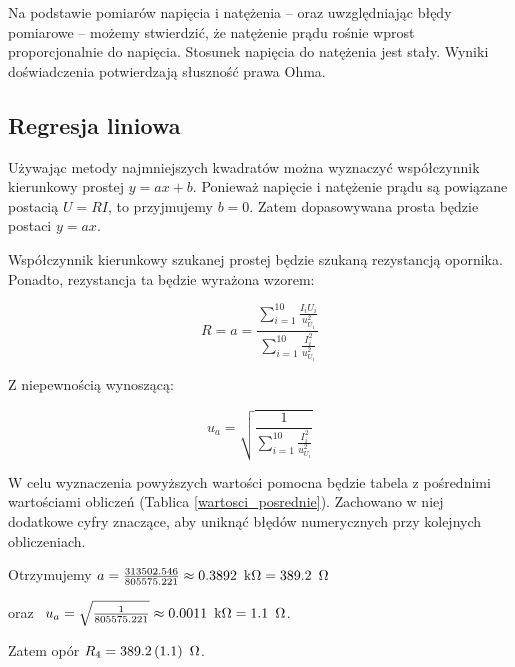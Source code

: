 \documentclass[a4paper]{article}
\newlength{\du}
\begin{document}
Na podstawie pomiarów napięcia i natężenia -- oraz uwzględniając błędy pomiarowe -- możemy stwierdzić, że natężenie prądu rośnie wprost proporcjonalnie do napięcia.
Stosunek napięcia do natężenia jest stały.
Wyniki doświadczenia potwierdzają słuszność prawa Ohma.

\subsection{Regresja liniowa}

Używając metody najmniejszych kwadratów można wyznaczyć współczynnik kierunkowy prostej $y = ax + b$.
Ponieważ napięcie i natężenie prądu są powiązane postacią $U = RI$, to przyjmujemy $b = 0$.
Zatem dopasowywana prosta będzie postaci $y = ax$.

Współczynnik kierunkowy szukanej prostej będzie szukaną rezystancją opornika. Ponadto, rezystancja ta będzie wyrażona wzorem:

$$R = a = \frac{\sum_{i = 1}^{10}\frac{I_i U_i}{u_{U_i}^2}}{\sum_{i = 1}^{10}\frac{I_i^2}{u_{U_i}^2}}$$

Z niepewnością wynoszącą:

$$u_a = \sqrt{\frac{1}{\sum_{i = 1}^{10}\frac{I_i^2}{u_{U_i}^2}}}$$

W celu wyznaczenia powyższych wartości pomocna będzie tabela z pośrednimi wartościami obliczeń (Tablica \ref{wartosci_posrednie}). Zachowano w niej dodatkowe cyfry znaczące, aby uniknąć błędów numerycznych przy kolejnych obliczeniach.


Otrzymujemy $a = \frac{313502.546}{805575.221} \approx 0.3892 \enskip \text{k} \Omega = 389.2 \enskip \Omega $ 

oraz $\enskip u_a = \sqrt{\frac{1}{805575.221}} \approx 0.0011 \enskip \text{k}\Omega = 1.1 \enskip \Omega$.

Zatem opór $R_4 = 389.2 \, (1.1) \enskip \Omega$.
\vspace{2em}
\end{document}
